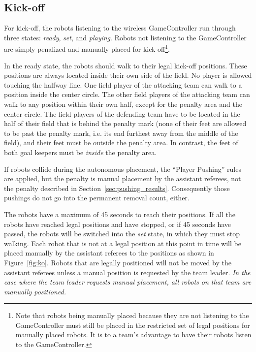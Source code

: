 \documentclass[12pt]{article}
\newcommand{\KickOffAutoTime}{45 seconds\xspace}
\begin{document}
\subsection{Kick-off}
\label{sec:kick-off}

For kick-off, the robots listening to the wireless GameController run through three states: \emph{ready}, \emph{set}, and \emph{playing}. Robots not listening to the GameController are simply penalized and manually placed for kick-off\footnote{Note that robots being manually placed because they are not listening to the GameController must still be placed in the restricted set of legal positions for manually placed robots. It is to a team's advantage to have their robots listen to the GameController.}.

In the ready state, the robots should walk to their legal kick-off positions. These positions are always located inside their own side of the field. No player is allowed touching the halfway line.
One field player of the attacking team can walk to a position inside the center circle.
The other field players of the attacking team can walk to any position within their own half, except for the penalty area and the center circle.
The field players of the defending team have to be located in the half of their field that is behind the penalty mark (none of their feet are allowed to be past the penalty mark, i.e. its end furthest away from the middle of the field), and their feet must be outside the penalty area.
In contrast, the feet of both goal keepers must be \emph{inside} the penalty area.

If robots collide during the autonomous placement, the ``Player Pushing'' rules are applied, but the penalty is manual placement by the assistant referees, not the penalty described in Section~\ref{sec:pushing_results}.
Consequently those pushings do not go into the permanent removal count, either.

The robots have a maximum of \KickOffAutoTime to reach their positions. If all the robots have reached legal positions and have stopped, or if \KickOffAutoTime have passed, the robots will be switched into the \emph{set} state, in which they must stop walking. Each robot that is not at a legal position at this point in time will be placed manually by the assistant referees to the positions as shown in Figure~\ref{fig:ko}. Robots that are legally positioned will not be moved by the assistant referees unless a manual position is requested by the team leader.
\emph{In the case where the team leader requests manual placement, all robots on that team are manually positioned.}
\end{document}
